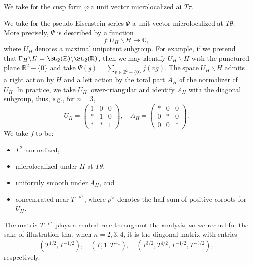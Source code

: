 We take for the cusp form $\varphi$ a unit vector microlocalized at $T \tau$.

We take for the pseudo Eisenstein series $\Psi$ a unit vector microlocalized at $T \theta$.  More precisely, $\Psi$ is described by a function
\begin{equation*}
  f : U_H \backslash H \rightarrow \mathbb{C},
\end{equation*}
where $U_H$ denotes a maximal unipotent subgroup.  For example, if we pretend that $\Gamma_H \backslash H = \SL_2(\mathbb{Z}) \backslash \SL_2(\mathbb{R})$, then we may identify $U_H \backslash H$ with the punctured plane $\mathbb{R}^2 - \{0\}$ and take $\Psi(g) = \sum_{v \in \mathbb{Z}^2 - \{0\}} f(v g)$.  The space $U_H \backslash H$ admits a right action by $H$ and a left action by the toral part $A_H$ of the normalizer of $U_H$.  In practice, we take $U_H$ lower-triangular and identify $A_H$ with the diagonal subgroup, thus, e.g., for $n=3$,
\begin{equation*}
  U_H = \begin{pmatrix}
    1 & 0 & 0 \\
    \ast & 1 & 0 \\
    \ast & \ast & 1
  \end{pmatrix},
  \quad
  A_H = \begin{pmatrix}
    \ast& 0 & 0 \\
    0 & \ast & 0 \\
    0 & 0 & \ast
  \end{pmatrix}.
\end{equation*}
We take $f$ to be:
\begin{itemize}
\item $L^2$-normalized,
\item microlocalized under $H$ at $T \theta$,
\item uniformly smooth under $A_H$, and
\item concentrated near $T^{-\rho^\vee}$, where $\rho^\vee$ denotes the half-sum of positive coroots for $U_H$.
\end{itemize}
The matrix $T^{- \rho^\vee}$ plays a central role throughout the analysis, so we record for the sake of illustration that when $n =2,3,4$, it is the diagonal matrix with entries
\begin{equation*}
  (T^{1/2}, T^{-1/2}),
  \quad
  (T, 1, T^{-1}),
  \quad
  (T^{3/2}, T^{1/2}, T^{-1/2}, T^{-3/2}),
\end{equation*}
respectively.

